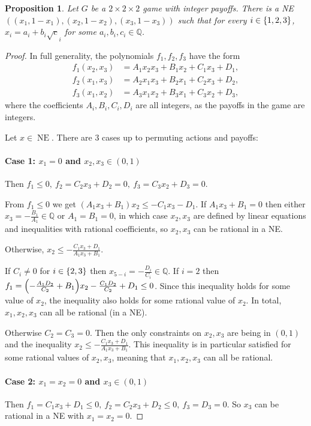 \documentclass[preprint,12pt,authoryear]{elsarticle}
\newtheorem{proposition}[theorem]{Proposition}
\newcommand{\Q}{\mathbb{Q}}
\DeclarePairedDelimiter{\iop}{(}{)}
\DeclarePairedDelimiter{\ios}{\{}{\}}
\newcommand{\p}{\iop*}
\newcommand{\s}{\ios*}
\DeclareMathOperator{\NE}{NE}
\begin{document}
\begin{proposition}\label{prop:n=3-sqrt}
  Let $G$ be a $2\times2\times2$ game with integer payoffs. There is a NE 
  $((x_1,1-x_1),(x_2,1-x_2),(x_3,1-x_3))$ such that for every $i\in\s{1,2,3}$, 
  $x_i=a_i+b_i\sqrt c_i$ for some $a_i,b_i,c_i\in\Q$.
\end{proposition}
\begin{proof}
  In full generality, the polynomials $f_1,f_2,f_3$ have the form
  \begin{align*}
    f_1(x_2,x_3)&=A_1x_2x_3+B_1x_2+C_1x_3+D_1,\\
    f_2(x_1,x_3)&=A_2x_1x_3+B_2x_1+C_2x_3+D_2,\\
    f_3(x_1,x_2)&=A_3x_1x_2+B_3x_1+C_3x_2+D_3,
  \end{align*}
  where the coefficients $A_i,B_i,C_i,D_i$ are all integers, as the payoffs in the game are 
  integers.

  Let $x\in\NE$.
  There are 3 cases up to permuting actions and payoffs:

  \paragraph{Case 1: $x_1=0$ and $x_2,x_3\in(0,1)$} Then 
  $f_1\le0,~f_2=C_2x_3+D_2=0,~f_3=C_3x_2+D_3=0$.

  From $f_1\le0$ we get $(A_1x_3+B_1)x_2\le-C_1x_3-D_1$. If $A_1x_3+B_1=0$ then either 
  $x_3=-\frac{B_1}{A_1}\in\Q$ or $A_1=B_1=0$, in which case $x_2,x_3$ are defined by linear 
  equations and inequalities with rational coefficients, so $x_2,x_3$ can be 
  rational in a NE.

  Otherwise, $x_2\le-\frac{C_1x_3+D_1}{A_1x_3+B_1}$.
  
  If $C_i\ne0$ for $i\in\s{2,3}$ then $x_{5-i}=-\frac{D_i}{C_i}\in\Q$. If $i=2$ then 
  $f_1=\p{-\frac{A_1D_2}{C_2}+B_1}x_2-\frac{C_1D_2}{C_2}+D_1\le0$. Since this inequality 
  holds for some value of $x_2$, the inequality also holds for some rational value of 
  $x_2$. In total, $x_1,x_2,x_3$ can all be rational (in a NE).

  Otherwise $C_2=C_3=0$. Then the only constraints on $x_2,x_3$ are being in $(0,1)$ and 
  the inequality $x_2\le-\frac{C_1x_3+D_1}{A_1x_3+B_1}$. This inequality is in particular 
  satisfied for some rational values of $x_2,x_3$, meaning that $x_1,x_2,x_3$ can all be 
  rational.
  
  \paragraph{Case 2: $x_1=x_2=0$ and $x_3\in(0,1)$} Then 
  $f_1=C_1x_3+D_1\le0,~f_2=C_2x_3+D_2\le0,~f_3=D_3=0$. So $x_3$ can be rational in a NE with $x_1=x_2=0$.


\end{proof}
\end{document}
